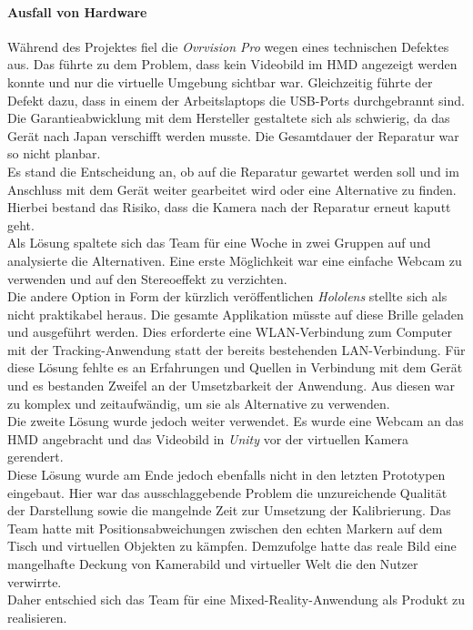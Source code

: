 \paragraph{Ausfall von Hardware} Während des Projektes fiel die \textit{Ovrvision Pro} wegen eines technischen Defektes aus. Das führte zu dem Problem, dass kein Videobild im HMD angezeigt werden konnte und nur die virtuelle Umgebung sichtbar war. Gleichzeitig führte der Defekt dazu, dass in einem der Arbeitslaptops die USB-Ports durchgebrannt sind. Die Garantieabwicklung mit dem Hersteller gestaltete sich als schwierig, da das Gerät nach Japan verschifft werden musste. Die Gesamtdauer der Reparatur war so nicht planbar. \\
Es stand die Entscheidung an, ob auf die Reparatur gewartet werden soll und im Anschluss mit dem Gerät weiter gearbeitet wird  oder eine Alternative zu finden. Hierbei bestand das Risiko, dass die Kamera nach der Reparatur erneut kaputt geht. \\
Als Lösung spaltete sich das Team für eine Woche in zwei Gruppen auf und analysierte die Alternativen. Eine erste Möglichkeit war eine einfache Webcam zu verwenden und auf den Stereoeffekt zu verzichten.\\
Die andere Option in Form der kürzlich veröffentlichen \textit{Hololens} stellte sich als nicht praktikabel heraus. Die gesamte Applikation müsste auf diese Brille geladen und ausgeführt werden. Dies erforderte eine WLAN-Verbindung zum Computer mit der Tracking-Anwendung statt der bereits bestehenden LAN-Verbindung. Für diese Lösung fehlte es an Erfahrungen und Quellen in Verbindung mit dem Gerät und es bestanden Zweifel an der Umsetzbarkeit der Anwendung. Aus diesen war zu komplex und zeitaufwändig, um sie als Alternative zu verwenden.\\
Die zweite Lösung wurde jedoch weiter verwendet. Es wurde eine Webcam an das HMD angebracht und das Videobild in \textit{Unity} vor der virtuellen Kamera gerendert.\\
Diese Lösung wurde am Ende jedoch ebenfalls nicht in den letzten Prototypen eingebaut. Hier war das ausschlaggebende Problem die unzureichende Qualität der Darstellung sowie die mangelnde Zeit zur Umsetzung der Kalibrierung. Das Team hatte mit Positionsabweichungen zwischen den echten Markern auf dem Tisch und virtuellen Objekten zu kämpfen. Demzufolge hatte das reale Bild eine mangelhafte Deckung von Kamerabild und virtueller Welt die den Nutzer verwirrte.\\
Daher entschied sich das Team für eine Mixed-Reality-Anwendung als Produkt zu realisieren.


